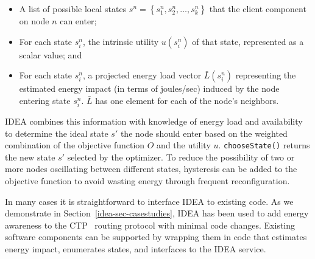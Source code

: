 \begin{itemize}

\item A list of possible local states $s^n = \left\{ s^n_1, s^n_2, \ldots,
s^n_k\right\}$ that the client component on node $n$ can enter;

\item For each state $s^n_i$, the intrinsic utility $u(s^n_i)$ of that state,
represented as a scalar value; and

\item For each state $s^n_i$, a projected energy load vector $\bar{L}(s^n_i)$
representing the estimated energy impact (in terms of joules/sec) induced by
the node entering state $s^n_i$. $\bar{L}$ has one element for each of the
node's neighbors.

\end{itemize}

IDEA combines this information with knowledge of energy load and availability
to determine the ideal state $s'$ the node should enter based on the weighted
combination of the objective function $O$ and the utility $u$.
\texttt{chooseState()} returns the new state $s'$ selected by the optimizer.
To reduce the possibility of two or more nodes oscillating between different
states, hysteresis can be added to the objective function to avoid wasting
energy through frequent reconfiguration.

In many cases it is straightforward to interface IDEA to existing code. As we
demonstrate in Section~\ref{idea-sec-casestudies}, IDEA has been used to add
energy awareness to the CTP~\cite{ctp-sensys09} routing protocol with minimal
code changes. Existing software components can be supported by wrapping them
in code that estimates energy impact, enumerates states, and interfaces to
the IDEA service.
